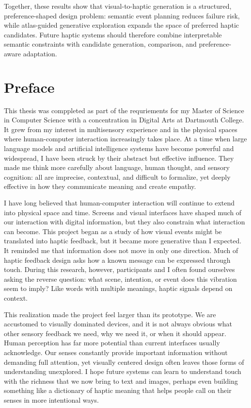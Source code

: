 \documentclass{dcthesis}
\theoremstyle{definition}
\theoremstyle{remark}
\begin{document}
Together, these results show that visual-to-haptic generation is a structured, preference-shaped design problem: semantic event planning reduces failure risk, while atlas-guided generative exploration expands the space of preferred haptic candidates.
Future haptic systems should therefore combine interpretable semantic constraints with candidate generation, comparison, and preference-aware adaptation.

\chapter*{Preface}
{}
This thesis was comppleted as part of the requriements for my Master of Science in Computer Science with a concentration in Digital Arts at Dartmouth College. It grew from my interest in multisensory experience and in the physical spaces where human-computer interaction increasingly takes place. At a time when large language models and artificial intelligence systems have become powerful and widespread, I have been struck by their abstract but effective influence. They made me think more carefully about language, human thought, and sensory cognition: all are imprecise, contextual, and difficult to formalize, yet deeply effective in how they communicate meaning and create empathy.

I have long believed that human-computer interaction will continue to extend into physical space and time. Screens and visual interfaces have shaped much of our interaction with digital information, but they also constrain what interaction can become. This project began as a study of how visual events might be translated into haptic feedback, but it became more generative than I expected. It reminded me that information does not move in only one direction. Much of haptic feedback design asks how a known message can be expressed through touch. During this research, however, participants and I often found ourselves asking the reverse question: what scene, intention, or event does this vibration seem to imply? Like words with multiple meanings, haptic signals depend on context.

This realization made the project feel larger than its prototype. We are accustomed to visually dominated devices, and it is not always obvious what other sensory feedback we need, why we need it, or when it should appear. Human perception has far more potential than current interfaces usually acknowledge. Our senses constantly provide important information without demanding full attention, yet visually centered design often leaves those forms of understanding unexplored. I hope future systems can learn to understand touch with the richness that we now bring to text and images, perhaps even building something like a dictionary of haptic meaning that helps people call on their senses in more intentional ways.
\end{document}
